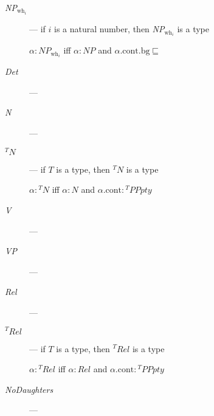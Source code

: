 \begin{description}
\item[\textnormal{\textit{NP}$_{\text{wh}_i}$}] --- if $i$ is a
  natural number, then \textit{NP}$_{\text{wh}_i}$ is a type

  $\alpha:\textit{NP}_{\text{wh}_i}$ iff $\alpha:\textit{NP}$ and
  $\alpha.\text{cont}.\text{bg}\sqsubseteq$

  
\item[\textnormal{\textit{Det}}] --- 
  
\item[\textnormal{\textit{N}}] --- 
  
\item[\textnormal{$^T\textit{N}$}] --- if $T$ is a type, then
  $^T\textit{N}$ is a type

  $\alpha:{^T\textit{N}}$ iff
  $\alpha:\textit{N}$ and $\alpha.\text{cont}:{^T\textit{PPpty}}$
  
\item[\textnormal{\textit{V}}] --- 
  
  
\item[\textnormal{\textit{VP}}] --- 

\item[\textnormal{\textit{Rel}}] --- 

  
\item[\textnormal{$^T\textit{Rel}$}] --- if $T$ is a type, then
  $^T\textit{Rel}$ is a type

  $\alpha:{^T\textit{Rel}}$ iff
  $\alpha:\textit{Rel}$ and $\alpha.\text{cont}:{^T\textit{PPpty}}$
  
\item[\textnormal{\textit{NoDaughters}}] ---


\end{description}
